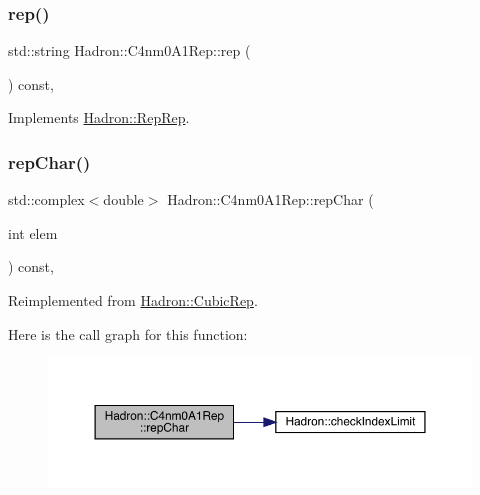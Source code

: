 \subsubsection{\texorpdfstring{rep()}{rep()}\hspace{0.1cm}{\footnotesize\ttfamily [5/5]}}
{\footnotesize\ttfamily std\+::string Hadron\+::\+C4nm0\+A1\+Rep\+::rep (\begin{DoxyParamCaption}{ }\end{DoxyParamCaption}) const\hspace{0.3cm}{\ttfamily [inline]}, {\ttfamily [virtual]}}



Implements \mbox{\hyperlink{structHadron_1_1RepRep_ab3213025f6de249f7095892109575fde}{Hadron\+::\+Rep\+Rep}}.

\mbox{\label{structHadron_1_1C4nm0A1Rep_ac54e244df5f9d7618d3033c48a7fb020}} 
\subsubsection{\texorpdfstring{repChar()}{repChar()}\hspace{0.1cm}{\footnotesize\ttfamily [1/3]}}
{\footnotesize\ttfamily std\+::complex$<$double$>$ Hadron\+::\+C4nm0\+A1\+Rep\+::rep\+Char (\begin{DoxyParamCaption}\item[{int}]{elem }\end{DoxyParamCaption}) const\hspace{0.3cm}{\ttfamily [inline]}, {\ttfamily [virtual]}}



Reimplemented from \mbox{\hyperlink{structHadron_1_1CubicRep_af45227106e8e715e84b0af69cd3b36f8}{Hadron\+::\+Cubic\+Rep}}.

Here is the call graph for this function\+:
\nopagebreak
\begin{figure}[H]
\begin{center}
\leavevmode
\includegraphics[width=350pt]{d8/d28/structHadron_1_1C4nm0A1Rep_ac54e244df5f9d7618d3033c48a7fb020_cgraph}
\end{center}
\end{figure}
\mbox{\label{structHadron_1_1C4nm0A1Rep_ac54e244df5f9d7618d3033c48a7fb020}} 
